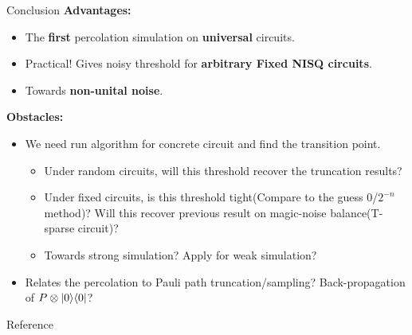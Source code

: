 \documentclass{beamer}
\begin{document}
\begin{frame}[allowframebreaks]{Conclusion}
\textbf{Advantages:}\\
\begin{itemize}
    \item The \textbf{first} percolation simulation on \textbf{universal} circuits.
    \item Practical! Gives noisy threshold for \textbf{arbitrary Fixed NISQ circuits}. 
    \item Towards \textbf{non-unital noise}.
\end{itemize}

\textbf{Obstacles:}\\
\begin{itemize}
    \item We need run algorithm for concrete circuit and find the transition point. 
    \begin{itemize}
        \item Under random circuits, will this threshold recover the truncation results?
        \item Under fixed circuits, is this threshold tight(Compare to the guess 0/$2^{-n}$ method)? Will this recover previous result on magic-noise balance(T-sparse circuit)?   
        \item Towards strong simulation? Apply for weak simulation?
    \end{itemize}
    \item Relates the percolation to Pauli path truncation/sampling? Back-propagation of $P \otimes \ket{0}\!\bra{0}$? 
\end{itemize}
    
\end{frame}


    

    

    

\begin{frame}[allowframebreaks]{Reference}
\printbibliography
\end{frame}
\end{document}
